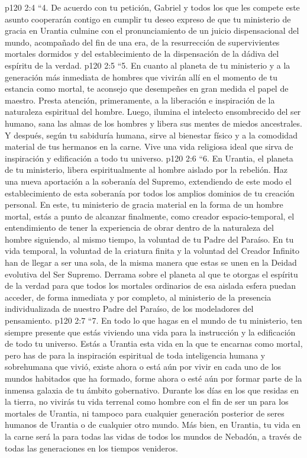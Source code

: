 \vs p120 2:4 \pc “4. De acuerdo con tu petición, Gabriel y todos los que les compete este asunto cooperarán contigo en cumplir tu deseo expreso de que tu ministerio de gracia en Urantia culmine con el pronunciamiento de un juicio dispensacional del mundo, acompañado del fin de una era, de la resurrección de supervivientes mortales dormidos y del establecimiento de la dispensación de la dádiva del espíritu de la verdad.
\vs p120 2:5 \pc “5. En cuanto al planeta de tu ministerio y a la generación más inmediata de hombres que vivirán allí en el momento de tu estancia como mortal, te aconsejo que desempeñes en gran medida el papel de maestro. Presta atención, primeramente, a la liberación e inspiración de la naturaleza espiritual del hombre. Luego, ilumina el intelecto ensombrecido del ser humano, sana las almas de los hombres y libera sus mentes de miedos ancestrales. Y después, según tu sabiduría humana, sirve al bienestar físico y a la comodidad material de tus hermanos en la carne. Vive una vida religiosa ideal que sirva de inspiración y edificación a todo tu universo.
\vs p120 2:6 \pc “6. En Urantia, el planeta de tu ministerio, libera espiritualmente al hombre aislado por la rebelión. Haz una nueva aportación a la soberanía del Supremo, extendiendo de este modo el establecimiento de esta soberanía por todos los amplios dominios de tu creación personal. En este, tu ministerio de gracia material en la forma de un hombre mortal, estás a punto de alcanzar finalmente, como creador espacio\hyp{}temporal, el entendimiento de tener la experiencia de obrar dentro de la naturaleza del hombre siguiendo, al mismo tiempo, la voluntad de tu Padre del Paraíso. En tu vida temporal, la voluntad de la criatura finita y la voluntad del Creador Infinito han de llegar a ser una sola, de la misma manera que estas se unen en la Deidad evolutiva del Ser Supremo. Derrama sobre el planeta al que te otorgas el espíritu de la verdad para que todos los mortales ordinarios de esa aislada esfera puedan acceder, de forma inmediata y por completo, al ministerio de la presencia individualizada de nuestro Padre del Paraíso, de los modeladores del pensamiento.
\vs p120 2:7 \pc “7. En todo lo que hagas en el mundo de tu ministerio, ten siempre presente que estás viviendo una vida para la instrucción y la edificación de todo tu universo. Estás  a Urantia esta vida en la que te encarnas como mortal, pero has de  para la inspiración espiritual de toda inteligencia humana y sobrehumana que vivió, existe ahora o está aún por vivir en cada uno de los mundos habitados que ha formado, forme ahora o esté aún por formar parte de la inmensa galaxia de tu ámbito gobernativo. Durante los días en los que residas en la tierra, no vivirás tu vida terrenal como hombre con el fin de ser un  para los mortales de Urantia, ni tampoco para cualquier generación posterior de seres humanos de Urantia o de cualquier otro mundo. Más bien, en Urantia, tu vida en la carne será la  para todas las vidas de todos los mundos de Nebadón, a través de todas las generaciones en los tiempos venideros.
